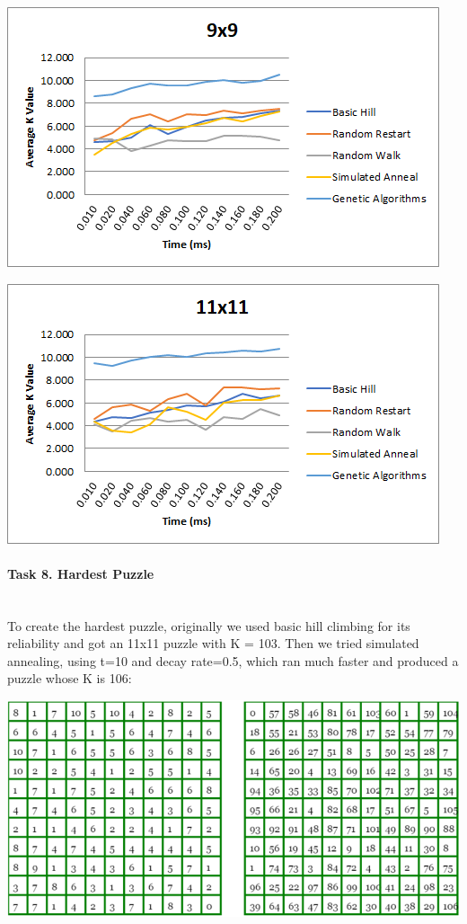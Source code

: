 \documentclass[12pt, letterpaper]{article}
\begin{document}
\includegraphics[width=\linewidth]{"Task 7/9x9 Timeplot"}

\includegraphics[width=\linewidth]{"Task 7/11x11 Timeplot"}

\pagebreak
\paragraph{Task 8. Hardest Puzzle} \mbox{}\\

To create the hardest puzzle, originally we used basic hill climbing for its reliability and got an 11x11 puzzle with K = 103. Then we tried simulated annealing, using t=10 and decay rate=0.5, which ran much faster and produced a puzzle whose K is 106:

\includegraphics[width=\linewidth]{"Task 8/Hardest Puzzle"}
\end{document}
